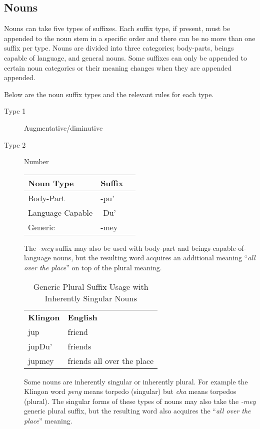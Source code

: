\documentclass[11pt]{article}
\begin{document}
\subsection {Nouns}

Nouns can take five types of suffixes. Each suffix type, if present, must be appended to the noun stem in a specific order and there can be no more than one suffix per type. Nouns are divided into three categories; body-parts, beings capable of language, and general nouns. Some suffixes can only be appended to certain noun categories or their meaning changes when they are appended appended.

Below are the noun suffix types and the relevant rules for each type.

\begin{description}
	\item[Type 1] Augmentative/diminutive
	\item[Type 2] Number

	\begin{center}
	\begin{tabular}{lll}
	\toprule
	\bf{Noun Type} & \bf{Suffix} \\
	\midrule
	Body-Part & -pu' \\
	Language-Capable & -Du' \\
	Generic & -mey \\
	\bottomrule
	\end{tabular}
	\end{center}

	The \textit{-mey} suffix may also be used with body-part and beings-capable-of-language nouns, but the resulting word acquires an additional meaning ``\textit{all over the place}'' on top of the plural meaning.
	
\begin{table}[h]
\begin{center}
\begin{tabular}{l|l}
\bf Klingon & \bf English \\
jup & friend \\
jupDu' & friends \\
jupmey & friends all over the place \\
\end{tabular}
\end{center}
\caption{Generic Plural Suffix Usage with Inherently Singular Nouns}
\end{table}

	Some nouns are inherently singular or inherently plural. For example the Klingon word \textit{peng} means torpedo (singular) but \textit{cha} means torpedos (plural). The singular forms of these types of nouns may also take the \textit{-mey} generic plural suffix, but the resulting word also acquires the ``\textit{all over the place}'' meaning.
	

\end{description}
\end{document}
